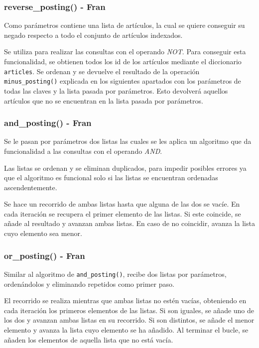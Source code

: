 \documentclass[12pt,a4paper]{article}
\begin{document}
\subsubsection{reverse\_posting() - Fran}
Como parámetros contiene una lista de artículos, la cual se quiere conseguir su negado respecto a todo el conjunto de artículos indexados.

Se utiliza para realizar las consultas con el operando \textit{NOT}. Para conseguir esta funcionalidad, se obtienen todos los id de los artículos mediante el diccionario \texttt{articles}. Se ordenan y se devuelve el resultado de la operación \texttt{minus\_posting()} explicada en los siguientes apartados con los parámetros de todas las claves y la lista pasada por parámetros. Esto devolverá aquellos artículos que no se encuentran en la lista pasada por parámetros.

\subsubsection{and\_posting() - Fran}
Se le pasan por parámetros dos listas las cuales se les aplica un algoritmo que da funcionalidad a las consultas con el operando \textit{AND}.

Las listas se ordenan y se eliminan duplicados, para impedir posibles errores ya que el algoritmo es funcional solo si las listas se encuentran ordenadas ascendentemente.

Se hace un recorrido de ambas listas hasta que alguna de las dos se vacíe. En cada iteración se recupera el primer elemento de las listas. Si este coincide, se añade al resultado y avanzan ambas listas. En caso de no coincidir, avanza la lista cuyo elemento sea menor.

\subsubsection{or\_posting() - Fran}
Similar al algoritmo de \texttt{and\_posting()}, recibe dos listas por parámetros, ordenándolos y eliminando repetidos como primer paso.

El recorrido se realiza mientras que ambas listas no estén vacías, obteniendo en cada iteración los primeros elementos de las listas. Si son iguales, se añade uno de los dos y avanzan ambas listas en su recorrido. Si son distintos, se añade el menor elemento y avanza la lista cuyo elemento se ha añadido. Al terminar el bucle, se añaden los elementos de aquella lista que no está vacía.
\end{document}
